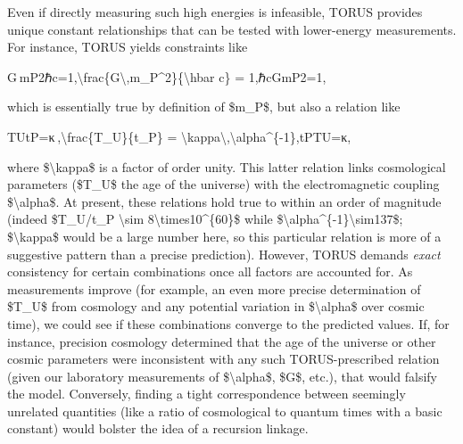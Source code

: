 \documentclass[
]{article}
\begin{document}
Even if directly measuring such high energies is infeasible, TORUS
provides unique constant relationships that can be tested with
lower-energy measurements. For instance, TORUS yields constraints like

G mP2ℏc=1,\textbackslash frac\{G\textbackslash,m\_P\^{}2\}\{\textbackslash hbar
c\} = 1,ℏcGmP2\hspace{0pt}\hspace{0pt}=1,

which is essentially true by definition of \$m\_P\$, but also a relation
like

TUtP=κ ,\textbackslash frac\{T\_U\}\{t\_P\} =
\textbackslash kappa\textbackslash,\textbackslash alpha\^{}\{-1\},tP\hspace{0pt}TU\hspace{0pt}\hspace{0pt}=κ,

where \$\textbackslash kappa\$ is a factor of order unity. This latter
relation links cosmological parameters (\$T\_U\$ the age of the
universe) with the electromagnetic coupling \$\textbackslash alpha\$. At
present, these relations hold true to within an order of magnitude
(indeed \$T\_U/t\_P \textbackslash sim
8\textbackslash times10\^{}\{60\}\$ while
\$\textbackslash alpha\^{}\{-1\}\textbackslash sim137\$;
\$\textbackslash kappa\$ would be a large number here, so this
particular relation is more of a suggestive pattern than a precise
prediction). However, TORUS demands \emph{exact} consistency for certain
combinations once all factors are accounted for. As measurements improve
(for example, an even more precise determination of \$T\_U\$ from
cosmology and any potential variation in \$\textbackslash alpha\$ over
cosmic time), we could see if these combinations converge to the
predicted values. If, for instance, precision cosmology determined that
the age of the universe or other cosmic parameters were inconsistent
with any such TORUS-prescribed relation (given our laboratory
measurements of \$\textbackslash alpha\$, \$G\$, etc.), that would
falsify the model. Conversely, finding a tight correspondence between
seemingly unrelated quantities (like a ratio of cosmological to quantum
times with a basic constant) would bolster the idea of a recursion
linkage.
\end{document}
